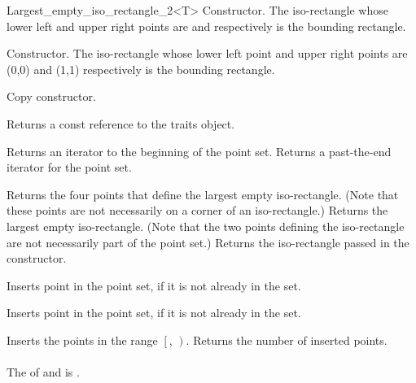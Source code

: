 \begin{ccRefClass}{Largest_empty_iso_rectangle_2<T>}
{Constructor. The iso-rectangle whose lower left and upper right points are  and
 respectively is the bounding rectangle.} 

{Constructor. The iso-rectangle whose lower left point and upper right points are (0,0) 
and (1,1) respectively is the bounding rectangle.} 

{Copy constructor.} 

%
\ccOperations
{}


{}

\ccAccessFunctions

{Returns a const reference to the traits object.}


{Returns an iterator to the beginning of the point set.}
{Returns a past-the-end iterator for the point set.}



{Returns the four points that define the largest empty iso-rectangle.
(Note that these points are not necessarily on a corner of an iso-rectangle.)}
\ccGlue
{}
{Returns the largest empty iso-rectangle. (Note that the two
points defining the iso-rectangle are not necessarily part of 
the point set.)}
\ccGlue
{}
{Returns  the iso-rectangle passed in the constructor.}

{Inserts point  in the point set, if it is not already in the set.}

{Inserts point  in the point set, if it is not already in the set.}

{Inserts the points in the range $\left[\right.$,
$\left.\right)$.  Returns the number of inserted points. \\ \\
\ccRequirements The  of  and  is .}


\end{ccRefClass}
